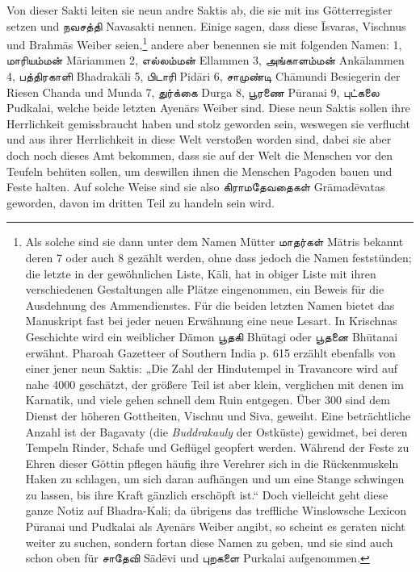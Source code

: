 \documentclass{article}
\newcommand{\TamilText}[1]{\texttamil{#1}}
\newcommand{\tam}[1]{\TamilText{#1}}
\begin{document}
Von dieser Sakti leiten sie neun andre Saktis ab, die sie mit ins Götterregister setzen und \tam{நவசத்தி} Navasakti nennen. Einige sagen, dass diese \={I}svaras, Vischnus und Brahm\={a}s Weiber seien,\footnote{Als solche sind sie dann unter dem Namen Mütter \tam{மாதர்கள்} M\={a}tris bekannt deren 7 oder auch 8 gezählt werden, ohne dass jedoch die Namen feststünden; die letzte in der gewöhnlichen Liste, K\={a}li, hat in obiger Liste mit ihren verschiedenen Gestaltungen alle Plätze eingenommen, ein Beweis für die Ausdehnung des Ammendienstes. Für die beiden letzten Namen bietet das Manuskript fast bei jeder neuen Erwähnung eine neue Lesart. In Krischnas Geschichte wird ein weiblicher Dämon \tam{பூதகி} Bh\={u}tagi oder \tam{பூதனை} Bh\={u}tanai erwähnt. Pharoah Gazetteer of Southern India p. 615 erzählt ebenfalls von einer jener neun Saktis: „Die Zahl der Hindutempel in Travancore wird auf nahe 4000 geschätzt, der größere Teil ist aber klein, verglichen mit denen im Karnatik, und viele gehen schnell dem Ruin entgegen. Über 300 sind dem Dienst der höheren Gottheiten, Vischnu und Siva, geweiht. Eine beträchtliche Anzahl ist der Bagavaty (die \emph{Buddrakauly} der Ostküste) gewidmet, bei deren Tempeln Rinder, Schafe und Geflügel geopfert werden. Während der Feste zu Ehren dieser Göttin pflegen häufig ihre Verehrer sich in die Rückenmuskeln Haken zu schlagen, um sich daran aufhängen und um eine Stange schwingen zu lassen, bis ihre Kraft gänzlich erschöpft ist.“ Doch vielleicht geht diese ganze Notiz auf Bhadra-Kali; da übrigens das treffliche Winslowsche Lexicon P\={u}ranai und Pudkalai als Ayen\={a}rs Weiber angibt, so scheint es geraten nicht weiter zu suchen, sondern fortan diese Namen zu geben, und sie sind auch schon oben für \tam{சாதேவி} S\={a}d\={e}vi und \tam{புறகளை} Purkalai aufgenommen.} andere aber benennen sie mit folgenden Namen: 1, \tam{மாரியம்மன்} M\={a}riammen 2, \tam{எல்லம்மன்} Ellammen 3, \tam{அங்காளம்மன்} Ank\={a}lammen 4, \tam{பத்திரகாளி} Bhadrak\={a}li 5, \tam{பிடாரி} Pid\={a}ri 6, \tam{சாமுண்டி} Ch\={a}mundi Besiegerin der Riesen Chanda und Munda 7, \tam{துர்க்கை} Durga 8, \tam{பூரணை} P\={u}ranai 9, \tam{புட்கலை} Pudkalai, welche beide letzten Ayen\={a}rs Weiber sind. Diese neun Saktis sollen ihre Herrlichkeit gemissbraucht haben und stolz geworden sein, weswegen sie verflucht und aus ihrer Herrlichkeit in diese Welt verstoßen worden sind, dabei sie aber doch noch dieses Amt bekommen, dass sie auf der Welt die Menschen vor den Teufeln behüten sollen, um deswillen ihnen die Menschen Pagoden bauen und Feste halten. Auf solche Weise sind sie also \tam{கிராமதேவதைகள்} Gr\={a}mad\={e}vatas geworden, davon im dritten Teil zu handeln sein wird.
\end{document}
